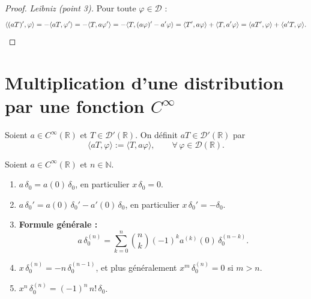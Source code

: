 \documentclass[12pt,a4paper,openany]{book}
\theoremstyle{definition}
\theoremstyle{plain}
\theoremstyle{remark}
\begin{document}
	\begin{proof}
		\emph{Leibniz (point 3).} Pour toute $\varphi \in \mathcal{D}$ :
		\[
		\langle (aT)', \varphi \rangle = -\langle aT, \varphi'\rangle = -\langle T, a\varphi'\rangle
		= -\langle T, (a\varphi)' - a'\varphi\rangle = \langle T', a\varphi\rangle + \langle T, a'\varphi\rangle
		= \langle aT', \varphi\rangle + \langle a'T, \varphi\rangle. \qedhere
		\]
	\end{proof}
	
	\section{Multiplication d'une distribution par une fonction \texorpdfstring{$C^\infty$}{C-infini}}
	
	\begin{definition}[Produit $aT$]
		Soient $a \in C^\infty(\mathbb{R})$ et $T \in \mathcal{D}'(\mathbb{R})$. On définit $aT \in \mathcal{D}'(\mathbb{R})$ par
		\[
		\langle aT, \varphi \rangle := \langle T, a\varphi \rangle, \qquad \forall\,\varphi \in \mathcal{D}(\mathbb{R}).
		\]
	\end{definition}
	
	\begin{proposition}
		Soient $a \in C^\infty(\mathbb{R})$ et $n \in \mathbb{N}$.
		\begin{enumerate}
			\item $a\,\delta_0 = a(0)\,\delta_0$, en particulier $x\,\delta_0 = 0$.
			\item $a\,\delta_0' = a(0)\,\delta_0' - a'(0)\,\delta_0$, en particulier $x\,\delta_0' = -\delta_0$.
			\item \textbf{Formule générale :}
			\[
			a\,\delta_0^{(n)} = \sum_{k=0}^{n} \binom{n}{k} (-1)^k a^{(k)}(0)\,\delta_0^{(n-k)}.
			\]
			\item $x\,\delta_0^{(n)} = -n\,\delta_0^{(n-1)}$, et plus généralement $x^m\,\delta_0^{(n)} = 0$ si $m > n$.
			\item $x^n\,\delta_0^{(n)} = (-1)^n\,n!\,\delta_0$.
		\end{enumerate}
	\end{proposition}
	
\end{document}
